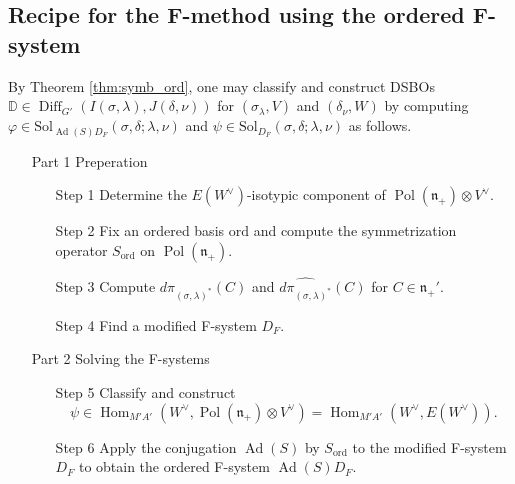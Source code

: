 \documentclass[a4paper,11pt,reqno]{amsart}
\newcommand{\frakn}{\mathfrak{n}}
\newcommand{\DD}{\mathbb{D}}
\newcommand{\0}{{\bf 0}}
\newcommand{\1}{{\bf 1}}
\DeclareMathOperator{\Ad}{Ad}
\DeclareMathOperator{\Hom}{Hom}
\DeclareMathOperator{\Pol}{Pol}
\newcommand{\ord}{{\mathrm{ord}}}
\DeclareMathOperator{\Diff}{Diff}
\theoremstyle{plain}
\theoremstyle{definition}
\numberwithin{equation}{section}
\theoremstyle{definition}
\begin{document}
\subsection{Recipe for the F-method using the ordered F-system}
\label{sec:recipe}

By Theorem \ref{thm:symb_ord},
one may classify and construct DSBOs
$\DD \in \Diff_{G'}(I(\sigma,\lambda),J(\delta,\nu))$
for $(\sigma_\lambda, V)$ and $(\delta_\nu,W)$
by computing 
$\varphi \in \mathrm{Sol}_{\Ad(S)D_F}(\sigma,\delta;\lambda,\nu)$
and 
$\psi \in\mathrm{Sol}_{D_F}(\sigma,\delta;\lambda,\nu)$
as follows.
\vskip 0.1in

\begin{enumerate}
\item[Part 1] Preperation
\vskip 0.1in

\begin{enumerate}

\item[Step 1]
Determine the $E(W^\vee)$-isotypic component of
$\Pol(\frakn_+)\otimes V^\vee$.
\vskip 0.1in

\item[Step 2]
Fix an ordered basis $\ord$ and
compute the symmetrization operator $S_\ord$ on $\Pol(\frakn_+)$.
\vskip 0.1in

\item[Step 3]
Compute $d\pi_{(\sigma,\lambda)^*}(C)$ and 
$\widehat{d\pi_{(\sigma,\lambda)^*}}(C)$
for $C \in \frakn_+'$.
\vskip 0.1in

\item[Step 4]
Find a modified F-system $D_F$.
\end{enumerate}

\vskip 0.2in

\item[Part 2] Solving the F-systems

\vskip 0.1in

\begin{enumerate}

\item[Step 5]
Classify and construct
\begin{equation*}
\psi \in \Hom_{M'A'}(W^\vee, \Pol(\frakn_+)\otimes V^\vee)
=\Hom_{M'A'}(W^\vee, E(W^\vee)).    
\end{equation*}
\vskip 0.1in


\item[Step 6]
Apply the conjugation $\Ad(S)$ by $S_\ord$ to the modified F-system $D_F$ 
to obtain the ordered F-system 
$\Ad(S)D_F$.


\end{enumerate}
\end{enumerate}
\end{document}
